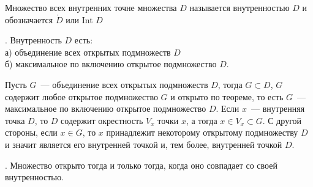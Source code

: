 \Op Множество всех внутренних точне множества $D$ называется внутренностью $D$ и обозначается $\mathring{D}$ или Int $ D$

. Внутренность $D$ есть:\\
а) объединение всех открытых подмножеств $D$\\
б) максимальное по включению открытое подмножество $D$.

\D Пусть $G$~--- объединение всех открытых подмножеств $D$, тогда $G \subset D$, $G$ содержит любое открытое подмножество $G$ и открыто по теореме, то есть $G$~--- максимальное по включению открытое подмножество $D$. Если $x$~--- внутренняя точка $D$, то $D$ содержит окрестность $V_x$ точки $x$, а тогда $x \in V_x \subset G$. С другой стороны, если $x \in G$, то $x$ принадлежит некоторому открытому подмножеству $D$ и значит является его внутренней точкой и, тем более, внутренней точкой $D$.

. Множество открыто тогда и только тогда, когда оно совпадает со своей внутренностью.